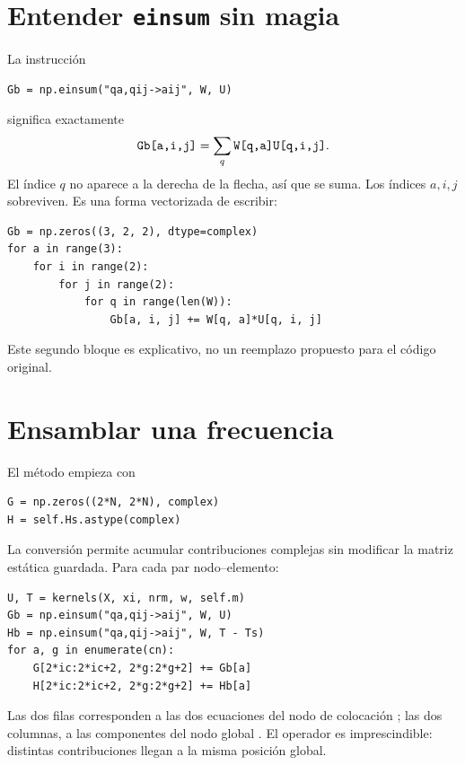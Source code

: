 \documentclass[11pt,a4paper]{report}
\numberwithin{equation}{chapter}
\DeclareRobustCommand{\code}[1]{\texttt{\detokenize{#1}}}
\begin{document}
\section{Entender \texttt{einsum} sin magia}
La instrucci\'on
\begin{lstlisting}
Gb = np.einsum("qa,qij->aij", W, U)
\end{lstlisting}
significa exactamente
\begin{equation}
  \code{Gb[a,i,j]}=\sum_q\code{W[q,a]}\code{U[q,i,j]}.
\end{equation}
El \'indice $q$ no aparece a la derecha de la flecha, as\'i que se suma.
Los \'indices $a,i,j$ sobreviven. Es una forma vectorizada de escribir:
\begin{lstlisting}
Gb = np.zeros((3, 2, 2), dtype=complex)
for a in range(3):
    for i in range(2):
        for j in range(2):
            for q in range(len(W)):
                Gb[a, i, j] += W[q, a]*U[q, i, j]
\end{lstlisting}
Este segundo bloque es explicativo, no un reemplazo propuesto para el
c\'odigo original.

\section{Ensamblar una frecuencia}
El m\'etodo \code{matrices(w)} empieza con
\begin{lstlisting}
G = np.zeros((2*N, 2*N), complex)
H = self.Hs.astype(complex)
\end{lstlisting}
La conversi\'on permite acumular contribuciones complejas sin modificar
la matriz est\'atica guardada. Para cada par nodo--elemento:
\begin{lstlisting}
U, T = kernels(X, xi, nrm, w, self.m)
Gb = np.einsum("qa,qij->aij", W, U)
Hb = np.einsum("qa,qij->aij", W, T - Ts)
for a, g in enumerate(cn):
    G[2*ic:2*ic+2, 2*g:2*g+2] += Gb[a]
    H[2*ic:2*ic+2, 2*g:2*g+2] += Hb[a]
\end{lstlisting}
Las dos filas corresponden a las dos ecuaciones del nodo de colocaci\'on
\code{ic}; las dos columnas, a las componentes del nodo global \code{g}.
El operador \code{+=} es imprescindible: distintas contribuciones llegan
a la misma posici\'on global.
\end{document}
